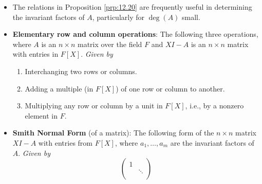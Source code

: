 \documentclass[../notes.tex]{subfiles}
\begin{document}
\begin{itemize}
\begin{lemma}
        \begin{proof}
            See the exercises.
        \end{proof}
    \end{lemma}
    \begin{proposition}\label{prp:12.20}
        Let $A$ be an $n\times n$ matrix over the field $F$.
        \begin{enumerate}
            \item The characteristic polynomial of $A$ is the product of all the invariant factors of $A$.
            \item (The Cayley-Hamilton Theorem) The minimal polynomial of $A$ divides the characteristic polynomial of $A$.
            \item The characteristic polynomial of $A$ divides some power of the minimal polynomial of $A$. In particular, these polynomials have the same roots, not counting multiplicities.
        \end{enumerate}
        \begin{proof}
            Given.
        \end{proof}
    \end{proposition}
    \item The relations in Proposition \ref{prp:12.20} are frequently useful in determining the invariant factors of $A$, particularly for $\deg(A)$ small.
    \item \textbf{Elementary row and column operations}: The following three operations, where $A$ is an $n\times n$ matrix over the field $F$ and $XI-A$ is an $n\times n$ matrix with entries in $F[X]$. \emph{Given by}
    \begin{enumerate}[label={(\roman*)}]
        \item Interchanging two rows or columns.
        \item Adding a multiple (in $F[X]$) of one row or column to another.
        \item Multiplying any row or column by a unit in $F[X]$, i.e., by a nonzero element in $F$.
    \end{enumerate}
    \item \textbf{Smith Normal Form} (of a matrix): The following form of the $n\times n$ matrix $XI-A$ with entries from $F[X]$, where $a_1,\dots,a_m$ are the invariant factors of $A$. \emph{Given by}
    \begin{equation*}
        \begin{pmatrix}
            1\\
            & \ddots\\

\end{pmatrix}
\end{equation*}
\end{itemize}
\end{document}
